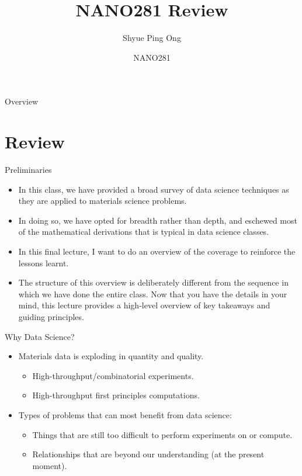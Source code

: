 \documentclass{beamer}
\title[NANO281 Review]{NANO281 Review}
\author{Shyue Ping Ong}
\institute[UCSD]{University of California, San Diego\\
\medskip
}
\date{NANO281} %
\begin{document}
\begin{frame}
    \titlepage %
\end{frame}


\begin{frame}{Overview}
    \tableofcontents
\end{frame}


\section{Review}


\begin{frame}{Preliminaries}
    \begin{itemize}
        \item In this class, we have provided a broad survey of data science techniques as they are applied to materials science problems.
        \item In doing so, we have opted for breadth rather than depth, and eschewed most of the mathematical derivations that is typical in data science classes.
        \item In this final lecture, I want to do an overview of the coverage to reinforce the lessons learnt.
        \item The structure of this overview is deliberately different from the sequence in which we have done the entire class. Now that you have the details in your mind, this lecture provides a high-level overview of key takeaways and guiding principles.
    \end{itemize}
\end{frame}


\begin{frame}{Why Data Science?}
    \begin{itemize}
        \item Materials data is exploding in quantity and quality.
        \begin{itemize}
            \item High-throughput/combinatorial experiments.
            \item High-throughput first principles computations.
        \end{itemize}
        \item Types of problems that can most benefit from data science:
        \begin{itemize}
            \item Things that are still too difficult to perform experiments on or compute.
            \item Relationships that are beyond our understanding (at the present moment). 
        \end{itemize}
    \end{itemize}
\end{frame}
\end{document}
